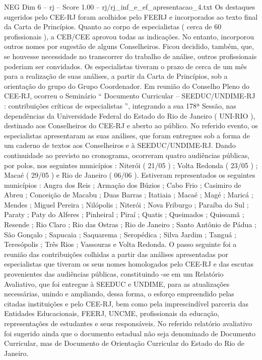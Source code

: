 \begin{textsample}{NEG Dim 6 – rj – Score 1.00 – rj/rj\_inf\_e\_ef\_apresentacao\_4.txt}
Os destaques sugeridos pelo CEE-RJ foram acolhidos pelo FEERJ e incorporados ao texto final da Carta de Princípios.
Quanto ao corpo de especialistas ( cerca de 60 profissionais ), a CEB/CEE aprovou todas as indicações.
No entanto, incorporou outros nomes por sugestão de alguns Conselheiros.
Ficou decidido, também, que, se houvesse necessidade no transcorrer do trabalho de análise, outros profissionais poderiam ser convidados.
Os especialistas tiveram o prazo de cerca de um mês para a realização de suas análises, a partir da Carta de Princípios, sob a orientação do grupo do Grupo Coordenador.
Em reunião do Conselho Pleno do CEE-RJ, ocorreu o Seminário “ Documento Curricular – SEEDUC/UNDIME-RJ : contribuições críticas de especialistas ”, integrando a sua 178ª Sessão, nas dependências da Universidade Federal do Estado do Rio de Janeiro ( UNI-RIO ), destinado aos Conselheiros do CEE-RJ e aberto ao público.
No referido evento, os especialistas apresentaram as suas análises, que foram entregues sob a forma de um caderno de textos aos Conselheiros e à SEEDUC/UNDIME-RJ.
Dando continuidade ao previsto no cronograma, ocorreram quatro audiências públicas, por polos, nos seguintes municípios : Niterói ( 21/05 ) ; Volta Redonda ( 23/05 ) ; Macaé ( 29/05 ) e Rio de Janeiro ( 06/06 ).
Estiveram representados os seguintes municípios : Angra dos Reis ; Armação dos Búzios ; Cabo Frio ; Casimiro de Abreu ; Conceição de Macabu ; Duas Barras ; Itatiaia ; Macaé ; Magé ; Maricá ; Mendes ; Miguel Pereira ; Nilópolis ; Niterói ; Nova Friburgo ; Paraíba do Sul ; Paraty ; Paty do Alferes ; Pinheiral ; Piraí ; Quatis ; Queimados ; Quissamã ; Resende ; Rio Claro ; Rio das Ostras ; Rio de Janeiro ; Santo Antônio de Pádua ; São Gonçalo ; Sapucaia ; Saquarema ; Seropédica ; Silva Jardim ; Tanguá ; Teresópolis ; Três Rios ; Vassouras e Volta Redonda.
O passo seguinte foi a reunião das contribuições colhidas a partir das análises apresentadas por especialistas que tiveram os seus nomes homologados pelo CEE-RJ e das escutas provenientes das audiências públicas, constituindo -se em um Relatório Avaliativo, que foi entregue à SEEDUC e UNDIME, para as atualizações necessárias, unindo e ampliando, dessa forma, o esforço empreendido pelas citadas instituições e pelo CEE-RJ, bem como pela imprescindível parceria das Entidades Educacionais, FEERJ, UNCME, profissionais da educação, representações de estudantes e seus responsáveis.
No referido relatório avaliativo foi sugerido ainda que o documento estadual não seja denominado de Documento Curricular, mas de Documento de Orientação Curricular do Estado do Rio de Janeiro.

\end{textsample}
